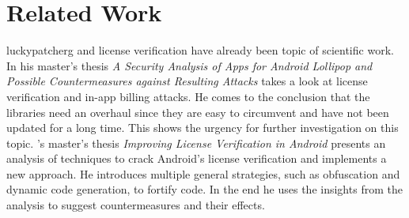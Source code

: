\section{Related Work} \label{subsection:introduction-related}
\gls{luckypatcherg} and license verification have already been topic of scientific work.
\newline
In his master's thesis \textit{A Security Analysis of Apps for Android Lollipop and Possible Countermeasures against Resulting Attacks} \cite{bernhardSecurity} \citeauthor{bernhardSecurity} takes a look at license verification and in-app billing attacks.
He comes to the conclusion that the libraries need an overhaul since they are easy to circumvent and have not been updated for a long time.
This shows the urgency for further investigation on this topic.
\newline
\citeauthor{munteanLicense}'s master's thesis \textit{Improving License Verification in Android} \cite{munteanLicense} presents an analysis of techniques to crack Android's license verification and implements a new approach.
He introduces multiple general strategies, such as obfuscation and dynamic code generation, to fortify code.
In the end he uses the insights from the analysis to suggest countermeasures and their effects.
